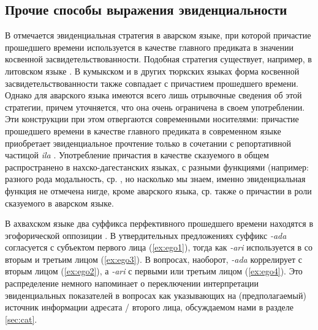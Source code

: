 \subsection{Прочие способы выражения эвиденциальности} \label{sec:otherevid}
\color{black}
В \citep[196--197]{forker2018evidavar} отмечается эвиденциальная стратегия в аварском языке, при которой причастие прошедшего времени используется в качестве главного предиката в значении косвенной засвидетельствованности. Подобная стратегия существует, например, в литовском языке \citep{walchli2000}. В кумыкском и в других тюркских языках форма косвенной засвидетельствованности также совпадает с причастием прошедшего времени. Однако для аварского языка имеются всего лишь отрывочные сведения об этой стратегии, причем уточняется, что она очень ограничена в своем употреблении. Эти конструкции при этом отвергаются современными носителями: причастие прошедшего времени в качестве главного предиката в современном языке приобретает эвиденциальное прочтение только в сочетании с репортативной частицой \textit{ila} \citep[196--197]{forker2018evidavar}. Употребление причастия в качестве сказуемого в общем распространено в нахско-дагестанских языках, с разными функциями (например: разного рода модальность, ср. \citep{Kalinina2003}, но насколько мы знаем, именно эвиденциальная функция не отмечена нигде, кроме аварского языка, ср. также \citep[69--80]{bokarev1949avar} о причастии в роли сказуемого в аварском языке.
\par В ахвахском языке два суффикса перфективного прошедшего времени находятся в эгофорической оппозиции \citep{creissels2009}. В утвердительных предложениях суффикс \textit{-ada} согласуется с субъектом первого лица (\ref{ex:ego1}), тогда как \textit{-ari} используется в со вторым и третьим лицом (\ref{ex:ego3}). В вопросах, наоборот, \textit{-ada} коррелирует с вторым лицом (\ref{ex:ego2}), а \textit{-ari} с первыми или третьим лицом (\ref{ex:ego4}). Это распределение немного напоминает о переключении интерпретации эвиденциальных показателей в вопросах как указывающих на (предполагаемый) источник информации адресата / второго лица, обсуждаемом нами в разделе \ref{sec:cat}.


